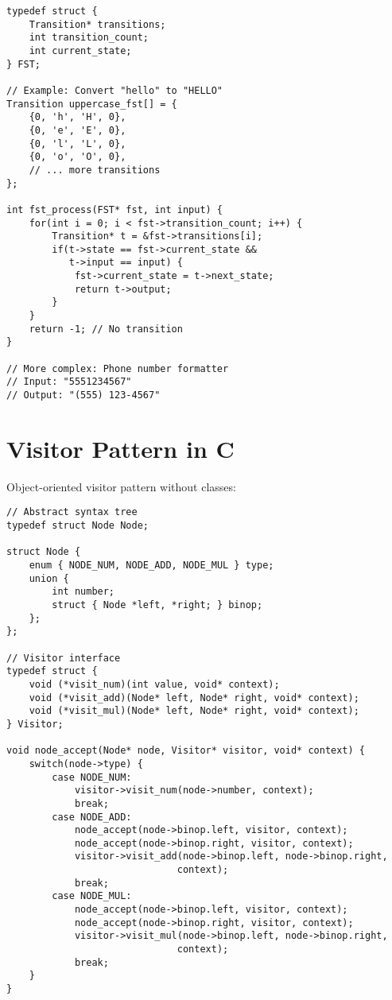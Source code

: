 \begin{description}[style=nextline,leftmargin=0pt]
\begin{lstlisting}
typedef struct {
    Transition* transitions;
    int transition_count;
    int current_state;
} FST;

// Example: Convert "hello" to "HELLO"
Transition uppercase_fst[] = {
    {0, 'h', 'H', 0},
    {0, 'e', 'E', 0},
    {0, 'l', 'L', 0},
    {0, 'o', 'O', 0},
    // ... more transitions
};

int fst_process(FST* fst, int input) {
    for(int i = 0; i < fst->transition_count; i++) {
        Transition* t = &fst->transitions[i];
        if(t->state == fst->current_state &&
           t->input == input) {
            fst->current_state = t->next_state;
            return t->output;
        }
    }
    return -1; // No transition
}

// More complex: Phone number formatter
// Input: "5551234567"
// Output: "(555) 123-4567"
\end{lstlisting}

\section{Visitor Pattern in C}

Object-oriented visitor pattern without classes:

\begin{lstlisting}
// Abstract syntax tree
typedef struct Node Node;

struct Node {
    enum { NODE_NUM, NODE_ADD, NODE_MUL } type;
    union {
        int number;
        struct { Node *left, *right; } binop;
    };
};

// Visitor interface
typedef struct {
    void (*visit_num)(int value, void* context);
    void (*visit_add)(Node* left, Node* right, void* context);
    void (*visit_mul)(Node* left, Node* right, void* context);
} Visitor;

void node_accept(Node* node, Visitor* visitor, void* context) {
    switch(node->type) {
        case NODE_NUM:
            visitor->visit_num(node->number, context);
            break;
        case NODE_ADD:
            node_accept(node->binop.left, visitor, context);
            node_accept(node->binop.right, visitor, context);
            visitor->visit_add(node->binop.left, node->binop.right,
                              context);
            break;
        case NODE_MUL:
            node_accept(node->binop.left, visitor, context);
            node_accept(node->binop.right, visitor, context);
            visitor->visit_mul(node->binop.left, node->binop.right,
                              context);
            break;
    }
}


\end{lstlisting}
\end{description}

